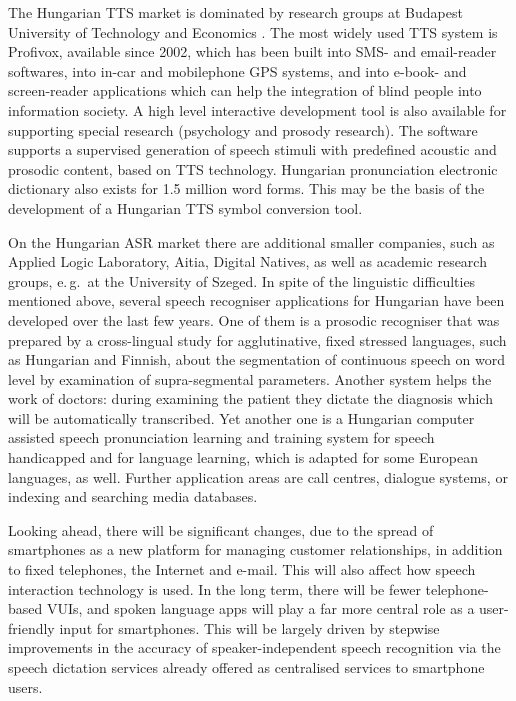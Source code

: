 \begin{multicols}{2}
  The Hungarian TTS market is dominated by research groups at Budapest University of Technology and Economics \cite{bme}. The most widely used TTS system is Profivox, available since 2002, which has been built into SMS- and email-reader softwares, into in-car and mobilephone GPS systems, and into e-book- and screen-reader applications which can help the integration of blind people into information society. A high level interactive development tool is also available for supporting special research (psychology and prosody research). The software supports a supervised generation of speech stimuli with predefined acoustic and prosodic content, based on TTS technology. Hungarian pronunciation electronic dictionary also exists for 1.5 million word forms. This may be the basis of the development of a Hungarian TTS symbol conversion tool.

  On the Hungarian ASR market there are additional smaller companies, such as Applied Logic Laboratory, Aitia, Digital Natives, as well as academic research groups, e.\,g.~at the University of Szeged. In spite of the linguistic difficulties mentioned above, several speech recogniser applications for Hungarian have been developed over the last few years. One of them is a prosodic recogniser that was prepared by a cross-lingual study for agglutinative, fixed stressed languages, such as Hungarian and Finnish, about the segmentation of continuous speech on word level by examination of supra-segmental parameters. Another system helps the work of doctors: during examining the patient they dictate the diagnosis which will be automatically transcribed. Yet another one is a Hungarian computer assisted speech pronunciation learning and training system for speech handicapped and for language learning, which is adapted for some European languages, as well. Further application areas are call centres, dialogue systems, or indexing and searching media databases. 

  Looking ahead, there will be significant changes, due to the spread of smartphones as a new platform for managing customer relationships, in addition to fixed telephones, the Internet and e-mail. This will also affect how speech interaction technology is used. In the long term, there will be fewer telephone-based VUIs, and spoken language apps will play a far more central role as a user-friendly input for smartphones. This will be largely driven by stepwise improvements in the accuracy of speaker-independent speech recognition via the speech dictation services already offered as centralised services to smartphone users.


\end{multicols}
